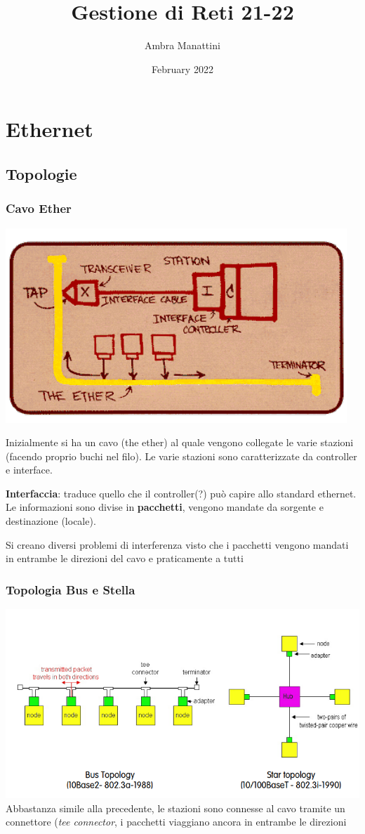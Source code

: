 \documentclass{article}
\title{Gestione di Reti 21-22}
\author{Ambra Manattini}
\date{February 2022}
\begin{document}
\maketitle

\tableofcontents
\newpage

\section{Ethernet}
\subsection{Topologie}
\subsubsection{Cavo Ether}
\includegraphics[]{ethernet.png}

Inizialmente si ha un cavo (the ether) al quale vengono collegate le varie stazioni (facendo proprio buchi nel filo).
Le varie stazioni sono caratterizzate da controller e interface.

\textbf{Interfaccia}: traduce quello che il controller(?) può capire allo standard ethernet.
Le informazioni sono divise in \textbf{pacchetti}, vengono mandate da sorgente e destinazione (locale). 
\par Si creano diversi problemi di interferenza visto che i pacchetti vengono mandati in entrambe le direzioni del cavo e praticamente a tutti
\subsubsection{Topologia Bus e Stella}
\includegraphics[width=\linewidth]{2.png}
Abbastanza simile alla precedente, le stazioni sono connesse al cavo tramite un connettore (\textit{tee connector}, i pacchetti viaggiano ancora in entrambe le direzioni
\end{document}
